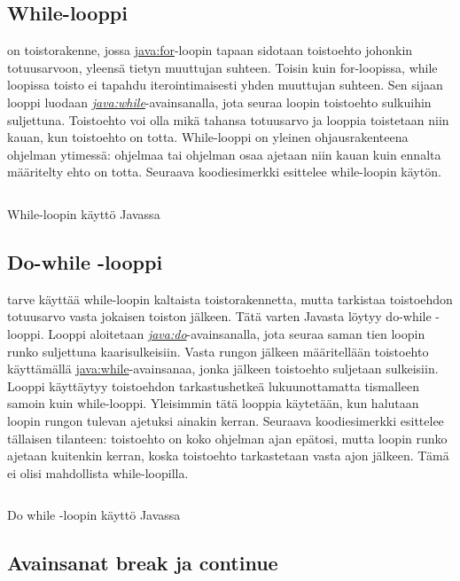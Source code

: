 \documentclass{tufte-book}
\newcommand{\java}[1]{\underline{\gls{java:#1}}}
\newcommand{\newjava}[1]{\textit{\java{#1}}}
\newcommand{\code}[3]{
\begin{listing}
    \inputminted{java}{OhjelmointiopasEsimerkit/src/#1/#2.java}
    \caption{#3}
    \label{Java-#1-#2}
\end{listing}
}
\begin{document}
\subsection{While-looppi}
\label{while}

 on toistorakenne, jossa \java{for}-loopin tapaan sidotaan toistoehto
johonkin totuusarvoon, yleensä tietyn muuttujan suhteen. Toisin kuin for-loopissa, while loopissa
toisto ei tapahdu iterointimaisesti yhden muuttujan suhteen. Sen sijaan looppi luodaan
\newjava{while}-avainsanalla, jota seuraa loopin toistoehto sulkuihin suljettuna. Toistoehto
voi olla mikä tahansa totuusarvo ja looppia toistetaan niin kauan, kun toistoehto on totta.
While-looppi on yleinen ohjausrakenteena ohjelman ytimessä: ohjelmaa tai ohjelman osaa ajetaan
niin kauan kuin ennalta määritelty ehto on totta. Seuraava koodiesimerkki esittelee while-loopin
käytön.

\code{week3/basicexamples}{BasicWhileLoop}{While-loopin käyttö Javassa}

\subsection{Do-while -looppi}
\label{do while}

 tarve käyttää while-loopin kaltaista toistorakennetta, mutta
tarkistaa toistoehdon totuusarvo vasta jokaisen toiston jälkeen. Tätä varten Javasta löytyy 
do-while -looppi. Looppi aloitetaan \newjava{do}-avainsanalla, jota seuraa saman tien loopin
runko suljettuna kaarisulkeisiin. Vasta rungon jälkeen määritellään toistoehto käyttämällä
\java{while}-avainsanaa, jonka jälkeen toistoehto suljetaan sulkeisiin. Looppi käyttäytyy
toistoehdon tarkastushetkeä lukuunottamatta tismalleen samoin kuin while-looppi. Yleisimmin tätä
looppia käytetään, kun halutaan loopin rungon tulevan ajetuksi ainakin kerran. Seuraava
koodiesimerkki esittelee tällaisen tilanteen: toistoehto on koko ohjelman ajan epätosi, mutta
loopin runko ajetaan kuitenkin kerran, koska toistoehto tarkastetaan vasta ajon jälkeen. Tämä ei
olisi mahdollista while-loopilla.

\code{week3/basicexamples}{DoWhileLoop}{Do while -loopin käyttö Javassa}

\subsection{Avainsanat break ja continue}
\label{break continue}
\end{document}
